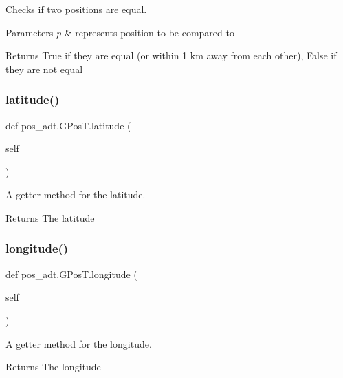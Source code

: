 Checks if two positions are equal. 


\begin{DoxyParams}{Parameters}
{\em p} & represents position to be compared to \\
\hline
\end{DoxyParams}
\begin{DoxyReturn}{Returns}
True if they are equal (or within 1 km away from each other), False if they are not equal 
\end{DoxyReturn}
\mbox{\label{classpos__adt_1_1_g_pos_t_a5e33788ed4070f65c646eb7269f29eff}} 
\subsubsection{\texorpdfstring{latitude()}{latitude()}}
{\footnotesize\ttfamily def pos\+\_\+adt.\+G\+Pos\+T.\+latitude (\begin{DoxyParamCaption}\item[{}]{self }\end{DoxyParamCaption})}



A getter method for the latitude. 

\begin{DoxyReturn}{Returns}
The latitude 
\end{DoxyReturn}
\mbox{\label{classpos__adt_1_1_g_pos_t_a7af546bfe3e2decc2e82105ab479e179}} 
\subsubsection{\texorpdfstring{longitude()}{longitude()}}
{\footnotesize\ttfamily def pos\+\_\+adt.\+G\+Pos\+T.\+longitude (\begin{DoxyParamCaption}\item[{}]{self }\end{DoxyParamCaption})}



A getter method for the longitude. 

\begin{DoxyReturn}{Returns}
The longitude 
\end{DoxyReturn}
\mbox{\label{classpos__adt_1_1_g_pos_t_ac073f4ce8d6a10a6325c5f667ea0c2a3}} 
